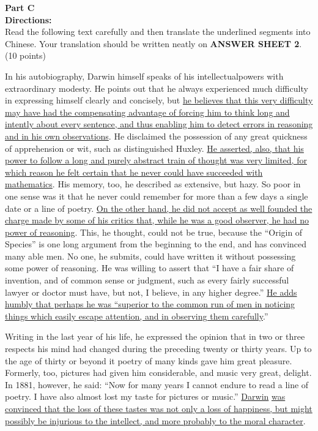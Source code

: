 \noindent
\textbf{Part C}\\
\textbf{Directions:}\\
Read the following text carefully and then translate the
underlined segments into Chinese. Your translation should be written
neatly on \textbf{ANSWER SHEET 2}. (10 points)



\TiGanSpace


In his autobiography, Darwin himself speaks of his intellectualpowers
with extraordinary modesty. He points out that he always experienced
much difficulty in expressing himself clearly and concisely, but
\transnum \uline{he believes that this very difficulty may have had the
compensating advantage of forcing him to think long and intently about
every sentence, and thus enabling him to detect errors in reasoning and
in his own observations}. He disclaimed the possession of any great
quickness of apprehension or wit, such as distinguished Huxley.
\transnum \uline{He asserted, also, that his power to follow a long and
purely abstract train of thought was very limited, for which reason he
felt certain that he never could have succeeded with mathematics}. His
memory, too, he described as extensive, but hazy. So poor in one sense
was it that he never could remember for more than a few days a single
date or a line of poetry. \transnum \uline{On the other hand, he did not
accept as well founded the charge made by some of his critics that,
while he was a good observer, he had no power of reasoning}. This, he
thought, could not be true, because the ``Origin of Species'' is one
long argument from the beginning to the end, and has convinced many able
men. No one, he submits, could have written it without possessing some
power of reasoning. He was willing to assert that ``I have a fair share
of invention, and of common sense or judgment, such as every fairly
successful lawyer or doctor must have, but not, I believe, in any higher
degree.'' \transnum \uline{He adds humbly that perhaps he was ``superior
to the common run of men in noticing things which easily escape
attention, and in observing them carefully}.''

Writing in the last year of his life, he expressed the opinion that in
two or three respects his mind had changed during the preceding twenty
or thirty years. Up to the age of thirty or beyond it poetry of many
kinds gave him great pleasure. Formerly, too, pictures had given him
considerable, and music very great, delight. In 1881, however, he said:
``Now for many years I cannot endure to read a line of poetry. I have
also almost lost my taste for pictures or music.''
\transnum \uline{Darwin} \uline{was convinced that the loss of these
tastes was not only a loss of happiness, but might possibly be injurious
to the intellect, and more probably to the moral character}.


